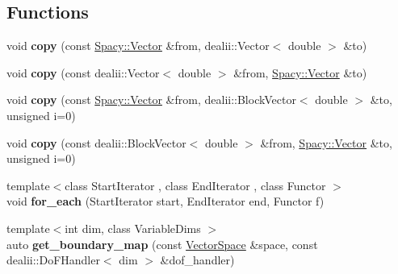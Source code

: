 \subsection*{\-Functions}
\begin{DoxyCompactItemize}
\item 
\hypertarget{namespaceSpacy_1_1dealII_a04fe7dee5a1cae496f7cea1bedf55436}{void {\bfseries copy} (const \hyperlink{classSpacy_1_1Vector}{\-Spacy\-::\-Vector} \&from, dealii\-::\-Vector$<$ double $>$ \&to)}\label{namespaceSpacy_1_1dealII_a04fe7dee5a1cae496f7cea1bedf55436}

\item 
\hypertarget{namespaceSpacy_1_1dealII_a06a29e6248e96f10f5f280a8d1ef2664}{void {\bfseries copy} (const dealii\-::\-Vector$<$ double $>$ \&from, \hyperlink{classSpacy_1_1Vector}{\-Spacy\-::\-Vector} \&to)}\label{namespaceSpacy_1_1dealII_a06a29e6248e96f10f5f280a8d1ef2664}

\item 
\hypertarget{namespaceSpacy_1_1dealII_a54dc2b5650da4d44ac0ec06ba2eefe13}{void {\bfseries copy} (const \hyperlink{classSpacy_1_1Vector}{\-Spacy\-::\-Vector} \&from, dealii\-::\-Block\-Vector$<$ double $>$ \&to, unsigned i=0)}\label{namespaceSpacy_1_1dealII_a54dc2b5650da4d44ac0ec06ba2eefe13}

\item 
\hypertarget{namespaceSpacy_1_1dealII_a6499e13e539f514fe25ea832955ee161}{void {\bfseries copy} (const dealii\-::\-Block\-Vector$<$ double $>$ \&from, \hyperlink{classSpacy_1_1Vector}{\-Spacy\-::\-Vector} \&to, unsigned i=0)}\label{namespaceSpacy_1_1dealII_a6499e13e539f514fe25ea832955ee161}

\item 
\hypertarget{namespaceSpacy_1_1dealII_acd641c7af30ce9e8dea35e2bb83d7ed0}{{\footnotesize template$<$class Start\-Iterator , class End\-Iterator , class Functor $>$ }\\void {\bfseries for\-\_\-each} (\-Start\-Iterator start, \-End\-Iterator end, \-Functor f)}\label{namespaceSpacy_1_1dealII_acd641c7af30ce9e8dea35e2bb83d7ed0}

\item 
\hypertarget{namespaceSpacy_1_1dealII_a2e99415b416185de7400ab54c162af8b}{{\footnotesize template$<$int dim, class Variable\-Dims $>$ }\\auto {\bfseries get\-\_\-boundary\-\_\-map} (const \hyperlink{classSpacy_1_1VectorSpace}{\-Vector\-Space} \&space, const dealii\-::\-Do\-F\-Handler$<$ dim $>$ \&dof\-\_\-handler)}\label{namespaceSpacy_1_1dealII_a2e99415b416185de7400ab54c162af8b}


\end{DoxyCompactItemize}
